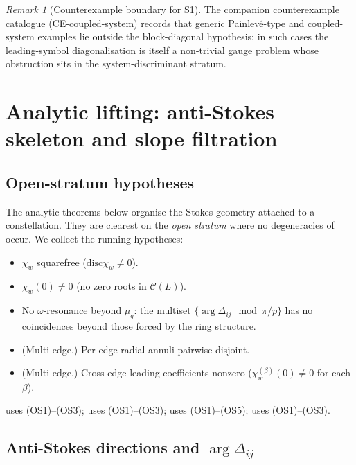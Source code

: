 \documentclass[11pt,a4paper]{article}
\theoremstyle{plain}
\theoremstyle{definition}
\theoremstyle{remark}
\newtheorem{remark}[theorem]{Remark}
\newcommand{\Cl}{\mathcal{C}}
\newcommand{\disc}{\mathrm{disc}}
\newcommand{\Dij}{\Delta_{ij}}
\DeclareMathOperator{\arginline}{arg}
\begin{document}
\begin{remark}[Counterexample boundary for S1]\label{rem:S1-counter}
The companion counterexample catalogue (CE-coupled-system) records that
generic Painlev{\'e}-type and coupled-system examples lie outside the
block-diagonal hypothesis; in such cases the leading-symbol diagonalisation
is itself a non-trivial gauge problem whose obstruction sits in the
system-discriminant stratum.
\end{remark}


\section{Analytic lifting: anti-Stokes skeleton and slope filtration}\label{sec:analytic}

\subsection{Open-stratum hypotheses}\label{ssec:OS}

The analytic theorems below organise the Stokes geometry attached to a
constellation. They are clearest on the \emph{open stratum} where no
degeneracies of  occur. We collect the running
hypotheses:
\begin{itemize}[leftmargin=2.5em]
\item[(OS1)] $\chi_w$ squarefree ($\disc \chi_w \ne 0$).
\item[(OS2)] $\chi_w(0) \ne 0$ (no zero roots in $\Cl(L)$).
\item[(OS3)] No $\omega$-resonance beyond $\mu_q$: the multiset
       $\{\arginline \Dij \mod \pi/p\}$ has no coincidences beyond
       those forced by the ring structure.
\item[(OS4)] (Multi-edge.) Per-edge radial annuli pairwise disjoint.
\item[(OS5)] (Multi-edge.) Cross-edge leading coefficients nonzero
       ($\chi_w^{(\beta)}(0) \ne 0$ for each $\beta$).
\end{itemize}
 uses (OS1)--(OS3);  uses (OS1)--(OS3);
 uses (OS1)--(OS5);  uses (OS1)--(OS3).

\subsection{\texorpdfstring{Anti-Stokes directions and $\arg \Delta_{ij}$}{Anti-Stokes directions and arg Delta\_ij}}\label{ssec:AT1}
\end{document}
